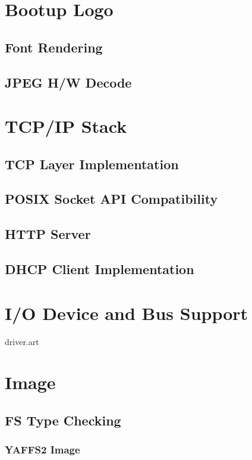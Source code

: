 \documentclass[a4paper,11pt]{book}
\begin{document}
\chapter{Bootup Logo}

\section{Font Rendering}

\section{JPEG H/W Decode}

\chapter{TCP/IP Stack}

\section{TCP Layer Implementation}

\section{POSIX Socket API Compatibility}

\section{HTTP Server}

\section{DHCP Client Implementation}

\chapter{I/O Device and Bus Support}
 {driver.art}

\chapter{Image}

\section{FS Type Checking}

\subsection{YAFFS2 Image}
\end{document}
